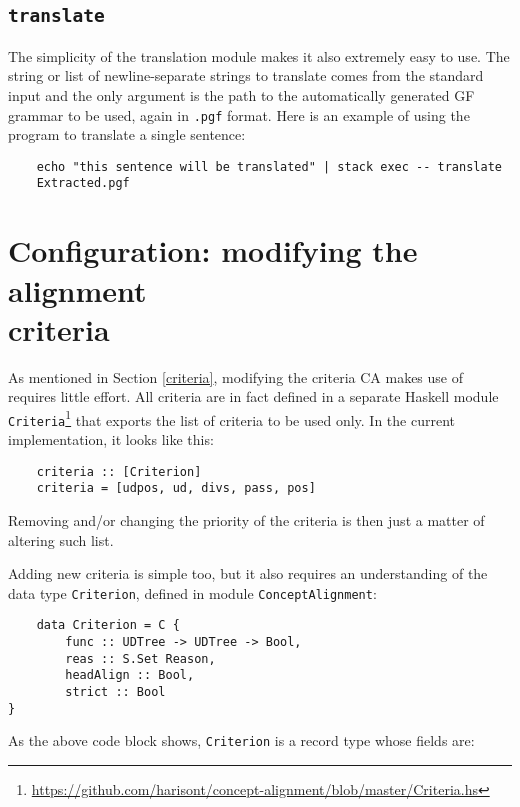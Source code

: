 \subsection{\texttt{translate}}
The simplicity of the translation module makes it also extremely easy to use. The string or list of newline-separate strings to translate comes from the standard input and the only argument is the path to the automatically generated GF grammar to be used, again in \texttt{.pgf} format. Here is an example of using the program to translate a single sentence: \smallskip

\begin{verbatim}
    echo "this sentence will be translated" | stack exec -- translate
    Extracted.pgf             
\end{verbatim}

\section{Configuration: modifying the alignment \\criteria} \label{cconf}
As mentioned in Section \ref{criteria}, modifying the criteria CA makes use of requires little effort. 
All criteria are in fact defined in a separate Haskell module \texttt{Criteria}\footnote{\url{https://github.com/harisont/concept-alignment/blob/master/Criteria.hs}} that exports the list of criteria to be used only. 
In the current implementation, it looks like this: \smallskip

\begin{lstlisting}
    criteria :: [Criterion]
    criteria = [udpos, ud, divs, pass, pos]
\end{lstlisting}

Removing and/or changing the priority of the criteria is then just a matter of altering such list. \smallskip

Adding new criteria is simple too, but it also requires an understanding of the data type \texttt{Criterion}, defined in module \texttt{ConceptAlignment}:

\begin{lstlisting}
    data Criterion = C {
        func :: UDTree -> UDTree -> Bool, 
        reas :: S.Set Reason,
        headAlign :: Bool,
        strict :: Bool
}
\end{lstlisting}

As the above code block shows, \texttt{Criterion} is a record type whose fields are:

